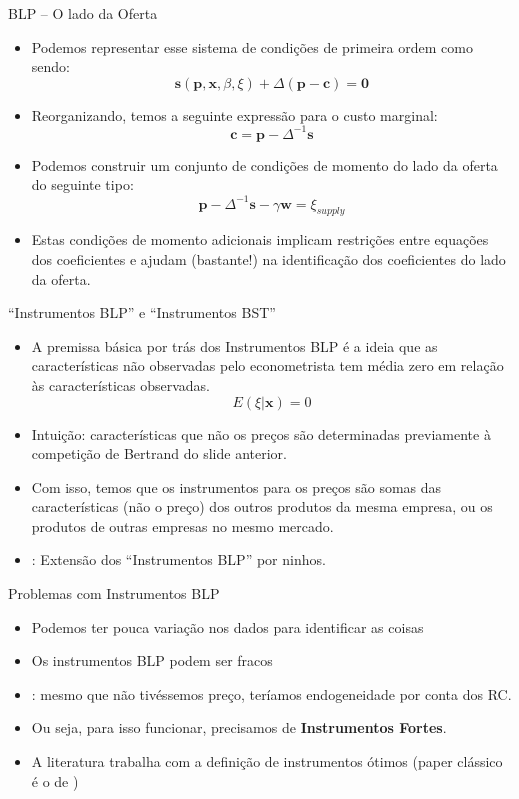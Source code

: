 \documentclass{beamer}
\begin{document}
\begin{frame}{BLP -- O lado da Oferta}
\begin{itemize}
    \item Podemos representar esse sistema de condições de primeira ordem como sendo:
    \[
    \mathbf{s}(\mathbf{p},\mathbf{x},\beta,\xi)+\Delta (\mathbf{p}-\mathbf{c})=\mathbf{0}
    \]
    \item Reorganizando, temos a seguinte expressão para o custo marginal:
    \[
    \mathbf{c}=\mathbf{p}-\Delta^{-1}\mathbf{s}
    \]
    \item Podemos construir um conjunto de condições de momento do lado da oferta do seguinte tipo:
    \[
    \mathbf{p}-\Delta^{-1}\mathbf{s}-\gamma \mathbf{w}=\xi_{supply}
    \]
    \item Estas condições de momento adicionais implicam restrições entre equações dos coeficientes e ajudam (bastante!) na identificação dos coeficientes do lado da oferta.
\end{itemize}
    
\end{frame}
\begin{frame}{``Instrumentos BLP'' e ``Instrumentos BST''}
\begin{itemize}
    \item A premissa básica por trás dos Instrumentos BLP é a ideia que as características não observadas pelo econometrista tem média zero em relação às características observadas.
    \[
    E(\xi|\mathbf{x})=0
    \]
    \item Intuição: características que não os preços são determinadas previamente à competição de Bertrand do slide anterior.
    \item Com isso, temos que os instrumentos para os preços são somas das características (não o preço) dos outros produtos da mesma empresa, ou os produtos de outras empresas no mesmo mercado.
    \item \citet{Bresnahan1997}: Extensão dos ``Instrumentos BLP'' por ninhos.
\end{itemize}
    
\end{frame}

\begin{frame}{Problemas com Instrumentos BLP}
\begin{itemize}
    \item Podemos ter pouca variação nos dados para identificar as coisas
    \item Os instrumentos BLP podem ser fracos
    \item \citet{Berry2014}: mesmo que não tivéssemos preço, teríamos endogeneidade por conta dos RC.
    \item Ou seja, para isso funcionar, precisamos de \textbf{Instrumentos Fortes}.
    \item A literatura trabalha com a definição de instrumentos ótimos (paper clássico é o de \citet{Chamberlain1987})
\end{itemize}
    
\end{frame}
\end{document}
